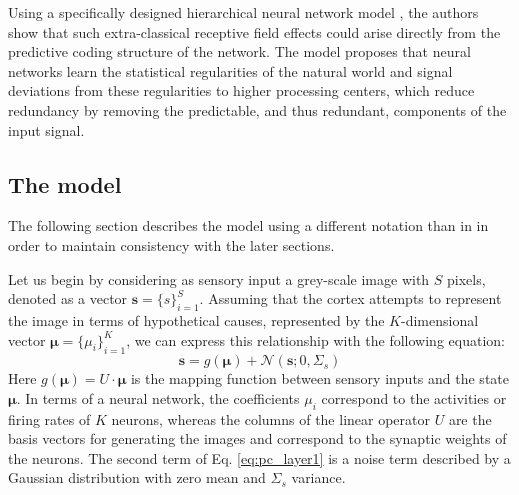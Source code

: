 \documentclass[10pt]{article}
\begin{document}
\begin{comment}
	\begin{figure}[!t]
	\centering
    \begin{subfigure}[b]{0.4\textwidth}
        \centering
        \texttt{[image: receptive\_field\_commented.png]}
        \caption{An example of a stimulus within a receptive field that might produce some activity in the corresponding neuron}
        \label{fig:rf}    
    \end{subfigure}
    \hfill
    \begin{subfigure}[b]{0.4\textwidth}
        \centering
        \texttt{[image: extra\_receptive\_field.png]}
        \caption{Example of a stimulus that extends beyond the neuron's classical receptive field}
        \label{fig:extra_rf}    
    \end{subfigure}
	\end{figure}
\end{comment}

Using a specifically designed hierarchical neural network model \citep{Rao1999}, the authors show that such extra-classical receptive field effects could arise directly from the predictive coding structure of the network. The model proposes that neural networks learn the statistical regularities of the natural world and signal deviations from these regularities to higher processing centers, which reduce redundancy by removing the predictable, and thus redundant, components of the input signal.

\subsection{The model}
The following section describes the model using a different notation than in \citep{Rao1999} in order to maintain consistency with the later sections.

Let us begin by considering as sensory input a grey-scale image with $S$ pixels, denoted as a vector $\bm{s} = \lbrace{ s \rbrace}_{i=1}^{S}$. 
Assuming that the cortex attempts to represent the image in terms of hypothetical causes, represented by the $K$-dimensional vector $\bm{\mu} = \lbrace{ \mu_i \rbrace}_{i=1}^{K}$, we can express this relationship with the following equation:
\begin{equation}
    \bm{s} = g(\bm{\mu}) + \mathcal{N}(\bm{s}; 0, \Sigma_{s})
    \label{eq:pc_layer1}
\end{equation}
Here $g(\bm{\mu}) = U \cdot \bm{\mu} $ is the mapping function between sensory inputs and the state $\bm{\mu}$.
In terms of a neural network, the coefficients $\mu_i$ correspond to the activities or firing rates of $K$ neurons, whereas the columns of the linear operator $U$ are the basis vectors for generating the images and correspond to the synaptic weights of the neurons. The second term of Eq. \ref{eq:pc_layer1} is a noise term described by a Gaussian distribution with zero mean and $\Sigma_s$ variance. 
\end{document}
